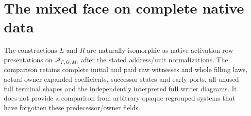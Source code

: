 \documentclass[11pt]{article}\usepackage{amsmath,amssymb,amsthm,geometry}\geometry{margin=1in}
\begin{document}
\section{The mixed face on complete native data}
\begin{theorem}
The constructions $L$ and $R$ are naturally isomorphic as native activation-row presentations on $\mathcal A_{F,G,M}$, after the stated address/unit normalizations. The comparison retains complete initial and paid raw witnesses and whole filling laws, actual owner-expanded coefficients, successor states and early ports, all unused full terminal shapes and the independently interpreted full writer diagrams. It does not provide a comparison from arbitrary opaque regrouped systems that have forgotten these predecessor/owner fields.
\end{theorem}
\end{document}

